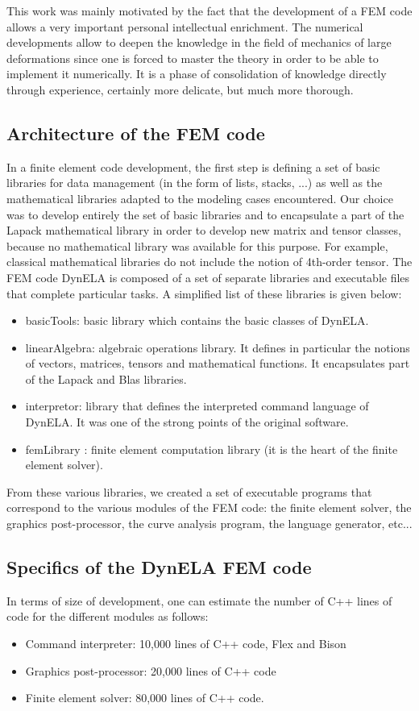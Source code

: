 This work was mainly motivated by the fact that the development of a FEM code allows a very important personal intellectual enrichment. The numerical developments allow to deepen the knowledge in the field of mechanics of large deformations since one is forced to master the theory in order to be able to implement it numerically. It is a phase of consolidation of knowledge directly through experience, certainly more delicate, but much more thorough.

\subsection{Architecture of the FEM code}

In a finite element code development, the first step is defining a set of basic libraries for data management (in the form of lists, stacks, ...) as well as the mathematical libraries adapted to the modeling cases encountered. Our choice was to develop entirely the set of basic libraries and to encapsulate a part of the Lapack \cite{Lapack:1999} mathematical library in order to develop new matrix and tensor classes, because no mathematical library was available for this purpose. For example, classical mathematical libraries do not include the notion of 4th-order tensor. The FEM code DynELA is composed of a set of separate libraries and executable files that complete particular tasks. A simplified list of these libraries is given below:
\begin{itemize}
\item basicTools: basic library which contains the basic classes of DynELA.
\item linearAlgebra: algebraic operations library. It defines in particular the notions of vectors, matrices, tensors and mathematical functions. It encapsulates part of the Lapack and Blas libraries.
\item interpretor: library that defines the interpreted command language of DynELA. It was one of the strong points of the original software.
\item femLibrary : finite element computation library (it is the heart of the finite element solver).
\end{itemize}
From these various libraries, we created a set of executable programs that correspond to the various modules of the FEM code: the finite element solver, the graphics post-processor, the curve analysis program, the language generator, etc...

\subsection{Specifics of the DynELA FEM code}
In terms of size of development, one can estimate the number of C++ lines of code for the different modules as follows:
\begin{itemize}
\item Command interpreter: 10,000 lines of C++ code, Flex and Bison \cite{Levine:2009}
\item Graphics post-processor: 20,000 lines of C++ code
\item Finite element solver: 80,000 lines of C++ code.
\end{itemize}

